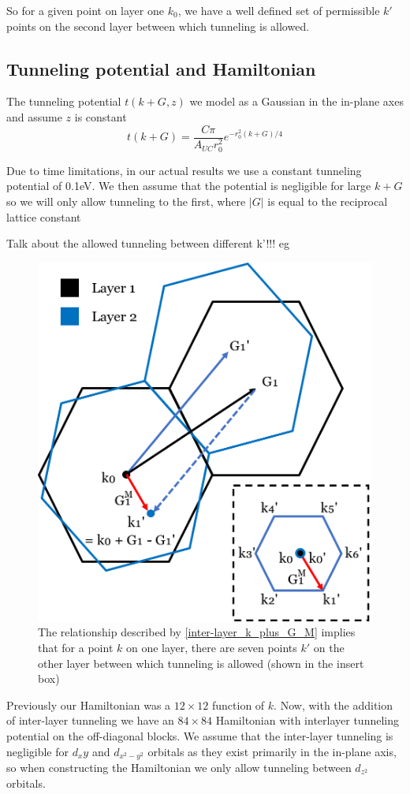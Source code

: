 \documentclass[12pt]{report} %
\begin{document}
  So for a given point on layer one $k_0$, we have a well defined set of permissible $k'$ points on the second layer between which tunneling is allowed.

\subsection*{Tunneling potential and Hamiltonian}

The tunneling potential $t(k + G, z)$ we model as a Gaussian in the in-plane axes and assume $z$ is constant
\begin{equation}
  t(k + G) = \frac{C\pi}{A_{UC} r_0^2}e^{- r_0^2 (k + G)/4}
\end{equation}

Due to time limitations, in our actual results we use a constant tunneling potential of 0.1eV. We then assume that the potential is negligible for large $k + G$ so we will only allow tunneling to the first, where $|G|$ is equal to the reciprocal lattice constant

Talk about the allowed tunneling between different k'!!! eg 

\begin{figure}[t!]
\centering
\includegraphics[width=0.6\columnwidth]{k_prime_diagram.png}
  \caption{
    The relationship described by \ref{inter-layer_k_plus_G_M} implies that for a point $k$ on one layer, there are seven points $k'$ on the other layer between which tunneling is allowed (shown in the insert box) }
  \label{inter-layer_k_prime_diagram}
\end{figure}

  Previously our Hamiltonian was a $12\times12$ function of $k$. Now, with the  addition of inter-layer tunneling we have an $84\times84$ Hamiltonian with interlayer tunneling potential on the off-diagonal blocks. We assume that the inter-layer tunneling is negligible for $d_xy$ and $d_{x^2-y^2}$ orbitals as they exist primarily in the in-plane axis, so when constructing the Hamiltonian we only allow tunneling between $d_{z^2}$ orbitals.
\end{document}
